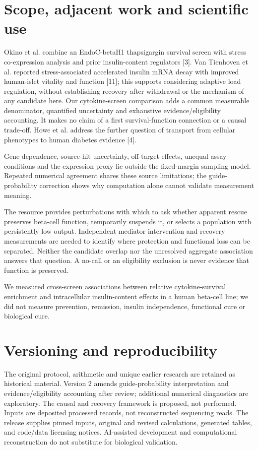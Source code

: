 \documentclass[10pt,letterpaper]{article}
\begin{document}
\section*{Scope, adjacent work and scientific use}
Okino et al. combine an EndoC-betaH1 thapsigargin survival screen with stress co-expression analysis and prior insulin-content regulators [3]. Van Tienhoven et al. reported stress-associated accelerated insulin mRNA decay with improved human-islet vitality and function [11]; this supports considering adaptive load regulation, without establishing recovery after withdrawal or the mechanism of any candidate here. Our cytokine-screen comparison adds a common measurable denominator, quantified uncertainty and exhaustive evidence/eligibility accounting. It makes no claim of a first survival-function connection or a causal trade-off. Howe et al. address the further question of transport from cellular phenotypes to human diabetes evidence [4].

Gene dependence, source-hit uncertainty, off-target effects, unequal assay conditions and the expression proxy lie outside the fixed-margin sampling model. Repeated numerical agreement shares these source limitations; the guide-probability correction shows why computation alone cannot validate measurement meaning.

The resource provides perturbations with which to ask whether apparent rescue preserves beta-cell function, temporarily suspends it, or selects a population with persistently low output. Independent mediator intervention and recovery measurements are needed to identify where protection and functional loss can be separated. Neither the candidate overlap nor the unresolved aggregate association answers that question. A no-call or an eligibility exclusion is never evidence that function is preserved.

We measured cross-screen associations between relative cytokine-survival enrichment and intracellular insulin-content effects in a human beta-cell line; we did not measure prevention, remission, insulin independence, functional cure or biological cure.

\section*{Versioning and reproducibility}
The original protocol, arithmetic and unique earlier research are retained as historical material. Version 2 amends guide-probability interpretation and evidence/eligibility accounting after review; additional numerical diagnostics are exploratory. The causal and recovery framework is proposed, not performed. Inputs are deposited processed records, not reconstructed sequencing reads. The release supplies pinned inputs, original and revised calculations, generated tables, and code/data licensing notices. AI-assisted development and computational reconstruction do not substitute for biological validation.
\end{document}
